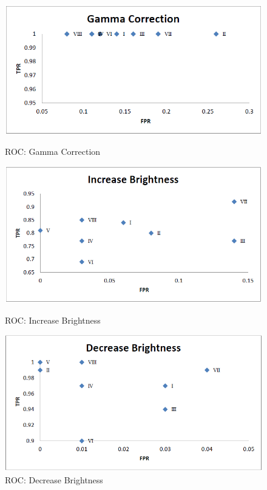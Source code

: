 \documentclass[12pt,a4paper]{jihmsp}
\begin{document}
{{\begin{figure}[h]
	\begin{multicols}{3}
		\includegraphics[width=\linewidth]{7gammacorrection.png}\par\caption{ROC: Gamma Correction}
		\includegraphics[width=\linewidth]{8increasebrightness.png}\par\caption{ROC: Increase Brightness}
		\includegraphics[width=\linewidth]{9decreasebrightness.png}\par\caption{ROC: Decrease Brightness}
		
	\end{multicols}
\end{figure}

}}
\end{document}
